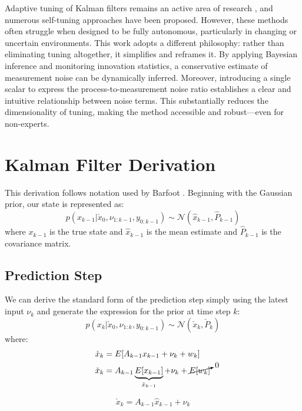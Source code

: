 \documentclass[a4paper]{article}
\begin{document}
Adaptive tuning of Kalman filters remains an active area of research \cite{simon2006optimal, shumway2017time, sarkka2013bayesian}, and numerous self-tuning approaches have been proposed. However, these methods often struggle when designed to be fully autonomous, particularly in changing or uncertain environments. This work adopts a different philosophy: rather than eliminating tuning altogether, it simplifies and reframes it. By applying Bayesian inference and monitoring innovation statistics, a conservative estimate of measurement noise can be dynamically inferred. Moreover, introducing a single scalar to express the process-to-measurement noise ratio establishes a clear and intuitive relationship between noise terms. This substantially reduces the dimensionality of tuning, making the method accessible and robust—even for non-experts.

	\section{Kalman Filter Derivation}
	This derivation follows notation used by Barfoot \cite{barfoot2017state}. Beginning with the Gaussian prior, our state is represented as:
	\begin{equation}
		p(x_{k-1} | \check{x}_{0}, \nu_{1:k-1}, y_{0:k-1}) \sim \mathcal{N}(\hat{x}_{k-1}, \hat{P}_{k-1})
	\end{equation}
	where $x_{k-1}$ is the true state and $\hat{x}_{k-1}$ is the mean estimate and $\hat{P}_{k-1}$ is the covariance matrix.

	\subsection{Prediction Step}
	We can derive the standard form of the prediction step simply using the latest input $\nu_k$ and generate the expression for the prior at time step $k$:
	\begin{equation}
	p(x_k | \check{x}_{0}, \nu_{1:k}, y_{0:k-1}) \sim \mathcal{N}(\check{x}_{k}, \check{P}_{k})
	\end{equation}
	where:
	\begin{align*}
		\check{x}_k &= E[A_{k-1}x_{k-1} + \nu_k + w_k] \\
		\check{x}_k &= A_{k-1} \underbrace{E[x_{k-1}]}_{\hat{x}_{k-1}} + \nu_k + \cancelto{0}{E[w_k]}
	\end{align*}

	\begin{equation}
		\check{x}_k = A_{k-1} \hat{x}_{k-1} + \nu_k
		\label{eq:process_model}
	\end{equation}
\end{document}
